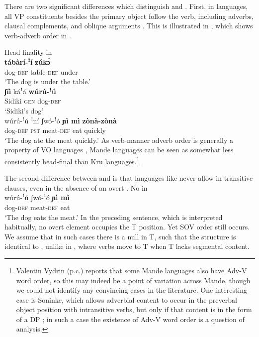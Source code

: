 \documentclass[output=paper,newtxmath,modfonts,nonflat,draftmode]{langsci/langscibook}
\begin{document}
There are two significant differences which distinguish  and . First, in  languages, all VP constituents besides the primary object follow the verb, including adverbs, clausal complements, and oblique arguments \citep{nikitina09}. This is illustrated in , which shows verb-adverb order in .

\ea Head finality in  \label{ex:8:dafing}
 \\
 \textbf{{tábàrí-ꜝí}} \textbf{{zúk{\`ɔ}}} \\
dog-\textsc{def} table-\textsc{def} under \\
\glt  `The dog is under the table.'  \label{ex:8a:dafing}
\\
\gll \textbf{{ʃíì}} káꜝá \textbf{{wúrú-ꜝú}} \\
Sidiki \textsc{gen} dog-\textsc{def} \\
\glt `Sidiki's dog' \label{ex:8b:dafing}
\\
\gll wúrú-ꜝú {ꜝ{ní}} {ʃwó-ꜝó} \textbf{{ɲì mì}} \textbf{{zònà-zònà}} \\
{dog}-\textsc{def} \textsc{pst} meat-\textsc{def} eat quickly\\
\glt `The dog ate the meat quickly.' \label{ex:8c:dafing}
\z
\z
As verb-manner adverb order is generally a property of VO languages \citep{dryer07}, Mande languages can be seen as somewhat less consistently head-final than Kru languages.\footnote{Valentin Vydrin (p.c.) reports that some Mande languages also have Adv-V word order, so this may indeed be a point of variation across Mande, though we could not identify any convincing cases in the literature. One interesting case is Soninke, which allows adverbial content to occur in the preverbal object position with intransitive verbs, but only if that content is in the form of a DP \citep{creissels2017}; in such a case the existence of Adv-V word order is a question of analysis.}

The second difference between  and  is that  languages like  never allow  in transitive clauses, even in the absence of an overt . %
\ea No  in \\
\gll wúrú-ꜝú {} {ʃwó-ꜝó} \textbf{{ɲì mì}} \\
{dog}-\textsc{def} {} meat-\textsc{def} eat\\
\glt `The dog eats the meat.'
\z
In the preceding sentence, which is interpreted habitually, no overt  element occupies the T position. Yet SOV order still occurs. We assume that in such cases there is a null  in T, such that the structure is identical to , unlike in , where verbs move to T when T lacks segmental content.
\end{document}
